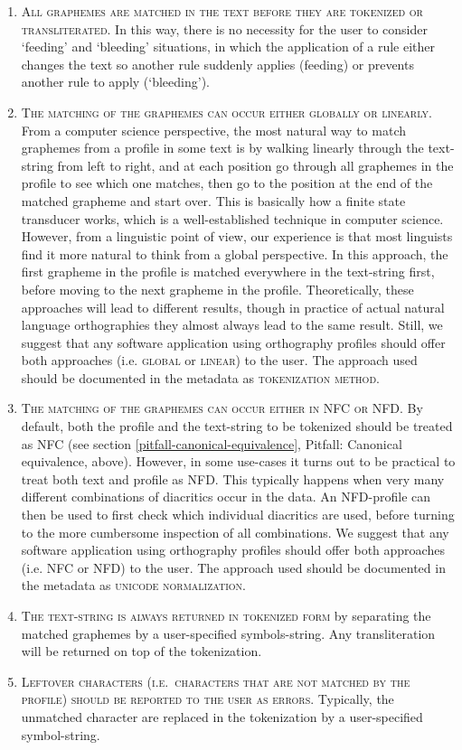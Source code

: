 \begin{enumerate}
	\def\labelenumi{\arabic{enumi}.} 
	\item \textsc{All graphemes are matched in the text before they are tokenized or transliterated}. In this way, there is no necessity for the user to consider `feeding' and `bleeding' situations, in which the application of a rule either changes the text so another rule suddenly applies (feeding) or prevents another rule to apply (`bleeding'). 
	\item \textsc{The matching of the graphemes can occur either globally or linearly. }From a computer science perspective, the most natural way to match graphemes from a profile in some text is by walking linearly through the text-string from left to right, and at each position go through all graphemes in the profile to see which one matches, then go to the position at the end of the matched grapheme and start over. This is basically how a finite state transducer works, which is a well-established technique in computer science. However, from a linguistic point of view, our experience is that most linguists find it more natural to think from a global perspective. In this approach, the first grapheme in the profile is matched everywhere in the text-string first, before moving to the next grapheme in the profile. Theoretically, these approaches will lead to different results, though in practice of actual natural language orthographies they almost always lead to the same result. Still, we suggest that any software application using orthography profiles should offer both approaches (i.e. \textsc{global} or \textsc{linear}) to the user. The approach used should be documented in the metadata as \textsc{tokenization method}. 
	\item \textsc{The matching of the graphemes can occur either in NFC or NFD. }By default, both the profile and the text-string to be tokenized should be treated as NFC (see section \ref{pitfall-canonical-equivalence}, Pitfall: Canonical equivalence, above). However, in some use-cases it turns out to be practical to treat both text and profile as NFD. This typically happens when very many different combinations of diacritics occur in the data. An NFD-profile can then be used to first check which individual diacritics are used, before turning to the more cumbersome inspection of all combinations. We suggest that any software application using orthography profiles should offer both approaches (i.e. \textsc{NFC} or \textsc{NFD}) to the user. The approach used should be documented in the metadata as \textsc{unicode normalization}. 
	\item \textsc{The text-string is always returned in tokenized form} by separating the matched graphemes by a user-specified symbols-string. Any transliteration will be returned on top of the tokenization. 
	\item \textsc{Leftover characters (i.e.~characters that are not matched by the profile) should be reported to the user as errors.} Typically, the unmatched character are replaced in the tokenization by a user-specified symbol-string. 
\end{enumerate}

